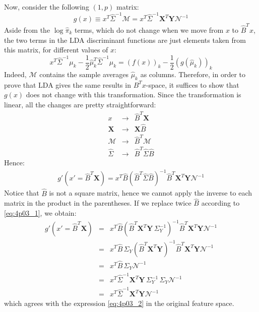 Now, consider the following $(1, p)$ matrix:
\begin{equation} \label{eq:4p03_2}
g(x) \equiv x^T \hat{\Sigma}^{-1} \mathcal{M} = x^T \hat{\Sigma}^{-1} \mathbf{X}^T \mathbf{Y} \mathcal{N}^{-1}
\end{equation}
Aside from the $\log{\hat{\pi}_k}$ terms, which do not change when we move from
$x$ to $\hat{B}^T x$, the two terms in the LDA discriminant functions are
just elements taken from this matrix, for different values of $x$:
\begin{equation*}
x^T \hat{\Sigma}^{-1} \mu_k - \frac{1}{2} \hat{\mu}_k^T \hat{\Sigma}^{-1} \mu_k = 
(f(x))_k - \frac{1}{2} (g(\hat{\mu}_k))_k
\end{equation*}
Indeed, $\mathcal{M}$ contains the sample averages $\hat{\mu}_k$ as columns.
Therefore, in order to prove that LDA gives the same results in $B^T x$-space,
it suffices to show that $g(x)$ does not change with this transformation.
Since the transformation is linear, all the changes are pretty straightforward:
\begin{eqnarray}
x & \rightarrow & \hat{B}^T \mathbf{X} \\
\mathbf{X} & \rightarrow & \mathbf{X} \hat{B} \\
\mathcal{M} & \rightarrow & \hat{B}^T \mathcal{M} \\
\hat{\Sigma} & \rightarrow & \hat{B}^T \hat{\Sigma} \hat{B}
\end{eqnarray}
Hence:
\begin{eqnarray*}
    g'(x' = \hat{B}^T \mathbf{X})  =  x^T \hat{B} \left(\hat{B}^T \hat{\Sigma} \hat{B}\right)^{-1} \hat{B}^T \mathbf{X}^T \mathbf{Y} \mathcal{N}^{-1}
\end{eqnarray*}
Notice that $\hat{B}$ is not a square matrix, hence we cannot apply the
inverse to each matrix in the product in the parentheses. If we replace twice 
$\hat{B}$ according to \eqref{eq:4p03_1}, we obtain:
\begin{eqnarray*}
    g'(x' = \hat{B}^T \mathbf{X}) & = & x^T \hat{B} \left(
        \hat{B}^T \mathbf{X}^T \mathbf{Y}\,\Sigma_Y^{-1}\right)^{-1} 
        \hat{B}^T \mathbf{X}^T \mathbf{Y} \mathcal{N}^{-1} \\
        & = & x^T \hat{B}\,\Sigma_Y \left(
        \hat{B}^T \mathbf{X}^T \mathbf{Y}\right)^{-1} \hat{B}^T \mathbf{X}^T \mathbf{Y} \mathcal{N}^{-1}\\
         & = & x^T \hat{B}\,\Sigma_Y \mathcal{N}^{-1} \\
         & = & x^T \hat{\Sigma}^{-1} \mathbf{X}^T \mathbf{Y}\, \Sigma_Y^{-1} \,\Sigma_Y \mathcal{N}^{-1} \\
         & = & x^T \hat{\Sigma}^{-1} \mathbf{X}^T \mathbf{Y} \mathcal{N}^{-1}
\end{eqnarray*}
which agrees with the expression \eqref{eq:4p03_2} in the original feature space.